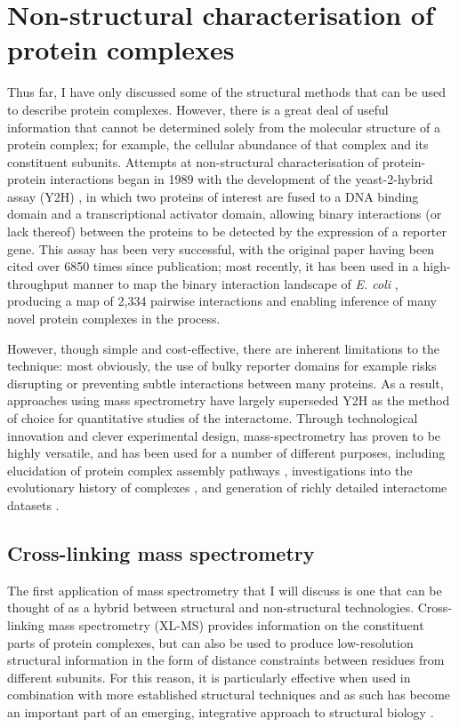 \documentclass[a4paper,11pt,twoside,openright]{scrbook}
\begin{document}
\section{Non-structural characterisation of protein complexes}
Thus far, I have only discussed some of the structural methods that can be used to describe protein complexes. However, there is a great deal of useful information that cannot be determined solely from the molecular structure of a protein complex; for example, the cellular abundance of that complex and its constituent subunits. Attempts at non-structural characterisation of protein-protein interactions began in 1989 with the development of the yeast-2-hybrid assay (Y2H) \cite{Fields1989}, in which two proteins of interest are fused to a DNA binding domain and a transcriptional activator domain, allowing binary interactions (or lack thereof) between the proteins to be detected by the expression of a reporter gene. This assay has been very successful, with the original paper having been cited over 6850 times since publication; most recently, it has been used in a high-throughput manner to map the binary interaction landscape of \textit{E. coli} \cite{Rajagopala2014}, producing a map of 2,334 pairwise interactions and enabling inference of many novel protein complexes in the process.


However, though simple and cost-effective, there are inherent limitations to the technique: most obviously, the use of bulky reporter domains for example risks disrupting or preventing subtle interactions between many proteins. As a result, approaches using mass spectrometry have largely superseded Y2H as the method of choice for quantitative studies of the interactome. Through technological innovation and clever experimental design, mass-spectrometry has proven to be highly versatile, and has been used for a number of different purposes, including elucidation of protein complex assembly pathways \cite{Levy2008a,Marsh2013}, investigations into the evolutionary history of complexes \cite{Wan2015}, and generation of richly detailed interactome datasets \cite{Hein2015}.

\subsection{Cross-linking mass spectrometry}
The first application of mass spectrometry that I will discuss is one that can be thought of as a hybrid between structural and non-structural technologies. Cross-linking mass spectrometry (XL-MS) provides information on the constituent parts of protein complexes, but can also be used to produce low-resolution structural information in the form of distance constraints between residues from different subunits. For this reason, it is particularly effective when used in combination with more established structural techniques and as such has become an important part of an emerging, integrative approach to structural biology \cite{Stengel2012,Ward2013}.
\end{document}
